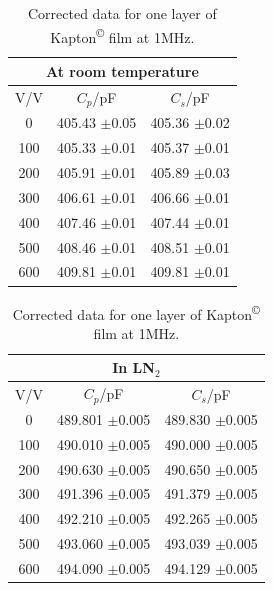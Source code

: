 \documentclass[a4paper,11pt]{article}
\begin{document}
\begin{table}[htbp]
\label{t:KapRTc}
\begin{center}
	\caption{Corrected data for one layer of Kapton\textsuperscript{\copyright} film at 1MHz.}
\begin{tabular}{| c | c | c |}
	\hline
	\multicolumn{3}{|c|}{At room temperature}\\
	\hline
		V/V & $C_{p}$/pF & $C_{s}$/pF\\ \hline
		
		0 & 405.43 $\pm$0.05 & 405.36 $\pm$0.02\\ \hline
		100 & 405.33 $\pm$0.01 & 405.37 $\pm$0.01\\ \hline
		200 & 405.91 $\pm$0.01 & 405.89 $\pm$0.03\\ \hline
		300 & 406.61 $\pm$0.01 & 406.66 $\pm$0.01\\ \hline
		400 & 407.46 $\pm$0.01 & 407.44 $\pm$0.01\\ \hline
		500 & 408.46 $\pm$0.01 & 408.51 $\pm$0.01\\ \hline
		600 & 409.81 $\pm$0.01 & 409.81 $\pm$0.01\\
	\hline
\end{tabular}
	\hfill
\begin{tabular}{| c | c | c |}
	\hline
	\multicolumn{3}{|c|}{In LN$_{2}$}\\
	\hline
		V/V & $C_{p}$/pF & $C_{s}$/pF\\ \hline
		
		0 & 489.801 $\pm$0.005 & 489.830 $\pm$0.005 \\ \hline
		100 & 490.010 $\pm$0.005 & 490.000 $\pm$0.005 \\ \hline
		200 & 490.630 $\pm$0.005 & 490.650 $\pm$0.005\\ \hline
		300 & 491.396 $\pm$0.005 & 491.379 $\pm$0.005\\ \hline
		400 & 492.210 $\pm$0.005 & 492.265 $\pm$0.005 \\ \hline
		500 & 493.060 $\pm$0.005 & 493.039 $\pm$0.005\\ \hline
		600 & 494.090 $\pm$0.005 & 494.129 $\pm$0.005\\
	\hline
\end{tabular}
	
\end{center}	
\end{table}
	
\end{document}
